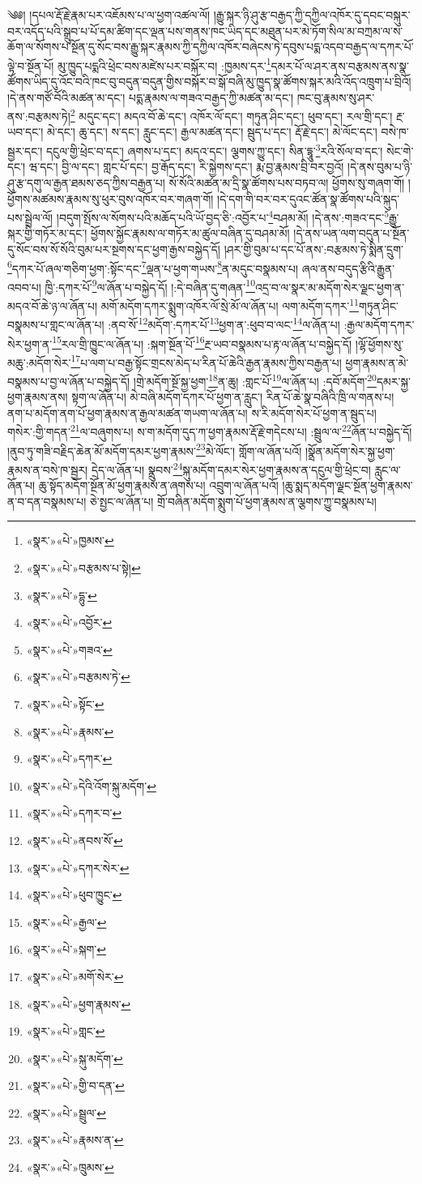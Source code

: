 ༄༅། །དཔལ་རྡོ་རྗེ་རྣམ་པར་འཇོམས་པ་ལ་ཕྱག་འཚལ་ལོ། །རྒྱུ་སྐར་ཉི་ཤུ་རྩ་བརྒྱད་ཀྱི་དཀྱིལ་འཁོར་དུ་དབང་བསྐུར་བར་འདོད་པའི་སྒྲུབ་པ་པོ་དམ་ཚིག་དང་ལྡན་པས་གནས་ཁང་ཡིད་དང་མཐུན་པར་མེ་ཏོག་སིལ་མ་བཀྲམ་ལ་ས་ཆོག་ལ་སོགས་པ་སྔོན་དུ་སོང་བས་རྒྱུ་སྐར་རྣམས་ཀྱི་དཀྱིལ་འཁོར་བཞེངས་ཏེ་དབུས་པདྨ་འདབ་བརྒྱད་ལ་དཀར་པོ་ལྟེ་བ་སྔོན་པོ། མུ་ཁྱུད་པདྨའི་ཕྲེང་བས་མཛེས་པར་བསྐོར་བ། :ཁྱམས་དར་\footnote{«སྣར་»«པེ་»ཁྱམས་}དམར་པོ་ལ་ཤར་ནས་བརྩམས་ནས་སྣ་ཚོགས་ཡིད་དུ་འོང་བའི་ཁང་བུ་བདུན་བདུན་གྱིས་བསྐོར་བ་སྒོ་བཞི་མུ་ཁྱུད་སྣ་ཚོགས་སྐར་མའི་འོད་འཁྲུག་པ་བྲིའོ། །དེ་ནས་གཙོ་བོའི་མཚན་མ་དང་། པདྨ་རྣམས་ལ་གཟའ་བརྒྱད་ཀྱི་མཚན་མ་དང་། ཁང་བུ་རྣམས་སུ་ཤར་ནས་:བརྩམས་ཏེ།\footnote{«སྣར་»«པེ་»བརྩམས་པ་སྟེ།} མདུང་དང་། མདའ་བོ་ཆེ་དང་། འཁོར་ལོ་དང་། གཏུན་ཤིང་དང་། ཕུབ་དང་། རལ་གྲི་དང་། རྔ་ཡབ་དང་། མེ་དང་། ཆུ་དང་། ས་དང་། རླུང་དང་། རྒྱལ་མཚན་དང་། སྦུད་པ་དང་། རྡོ་རྗེ་དང་། མེ་ལོང་དང་། བསེ་ཁ་སྦྱར་དང་། དངུལ་གྱི་ཕྲེང་བ་དང་། ཞགས་པ་དང་། མདའ་དང་། ལྕགས་ཀྱུ་དང་། སིན་དྷཱུ་\footnote{«སྣར་»«པེ་»དྷུ་}རའི་སོལ་བ་དང་། སེང་གེ་དང་། ཝ་དང་། བྱི་ལ་དང་། གླང་པོ་དང་། བྱ་རྒོད་དང་། རི་སྐྱེགས་དང་། རྨ་བྱ་རྣམས་བྲི་བར་བྱའོ། །དེ་ནས་བུམ་པ་ཉི་ཤུ་རྩ་དགུ་ལ་རྒྱན་ཐམས་ཅད་ཀྱིས་བརྒྱན་པ། སོ་སོའི་མཚན་མ་དྲི་སྣ་ཚོགས་པས་བཏབ་ལ། ཕྱོགས་སུ་གཞག་གོ། །ཕྱོགས་མཚམས་རྣམས་སུ་ཕུར་བུས་འཁོར་བར་གཞག་གོ། །དེ་དག་གི་བར་བར་དུའང་ཚོན་སྣ་ཚོགས་པའི་སྐུད་པས་སྦྲེལ་ལོ། །བདུག་སྤོས་ལ་སོགས་པའི་མཆོད་པའི་ཡོ་བྱད་ཅི་:འབྱོར་པ་\footnote{«སྣར་»«པེ་»འབྱོར་}བཤམ་མོ། །དེ་ནས་:གཟའ་དང་\footnote{«སྣར་»«པེ་»གཟའ་}རྒྱུ་སྐར་གྱི་གཏོར་མ་དང་། ཕྱོགས་སྐྱོང་རྣམས་ལ་གཏོར་མ་ཚུལ་བཞིན་དུ་བཤམ་མོ། །དེ་ནས་ཡན་ལག་བདུན་པ་སྔོན་དུ་སོང་བས་སོ་སོའི་བུམ་པར་སྔགས་དང་ཕྱག་རྒྱས་བསྐྱེད་དོ། །ཤར་གྱི་བུམ་པ་དང་པོ་ནས་:བརྩམས་ཏེ་སྨིན་དྲུག་\footnote{«སྣར་»«པེ་»བརྩམས་ཏེ་}དཀར་པོ་ཞལ་གཅིག་ཕྱག་:སྟོང་དང་\footnote{«སྣར་»«པེ་»སྟོང་}ལྡན་པ་ཕྱག་གཡས་\footnote{«སྣར་»«པེ་»རྣམས་}ན་མདུང་བསྣམས་པ། ཞལ་ནས་བདུད་རྩིའི་རྒྱུན་འབབ་པ། ཁྱི་:དཀར་པོ་\footnote{«སྣར་»«པེ་»དཀར་}ལ་ཞོན་པ་བསྐྱེད་དོ། །:དེ་བཞིན་དུ་གཞན་\footnote{«སྣར་»«པེ་»དེའི་འོག་སྐུ་མདོག་}འདྲ་བ་ལ་སྣར་མ་མདོག་སེར་ལྗང་ཕྱག་ན་མདའ་བོ་ཆེ་ཉ་ལ་ཞོན་པ། མགོ་མདོག་དཀར་སྨུག་འཁོར་ལོ་སྲེ་མོ་ལ་ཞོན་པ། ལག་མདོག་དཀར་\footnote{«སྣར་»«པེ་»དཀར་བ་}གཏུན་ཤིང་བསྣམས་པ་གླང་ལ་ཞོན་པ། :ནབ་སོ་\footnote{«སྣར་»«པེ་»ནབས་སོ་}མདོག་:དཀར་པོ་\footnote{«སྣར་»«པེ་»དཀར་སེར་}ཕྱག་ན་:ཕུབ་བ་ལང་\footnote{«སྣར་»«པེ་»ཕུབ་ཁྱུང་}ལ་ཞོན་པ། :རྒྱལ་མདོག་དཀར་སེར་ཕྱག་ན་\footnote{«སྣར་»«པེ་»རྒྱལ་}རལ་གྲི་ཁྱུང་ལ་ཞོན་པ། :སྐག་སྔོན་པོ་\footnote{«སྣར་»«པེ་»སྐག་}རྔ་ཡབ་བསྣམས་པ་རྟ་ལ་ཞོན་པ་བསྐྱེད་དོ། །ལྷོ་ཕྱོགས་སུ་མཆུ་:མདོག་སེར་\footnote{«སྣར་»«པེ་»མགོ་སེར་}པ་ལག་པ་བརྒྱ་སྟོང་གྲངས་མེད་པ་རིན་པོ་ཆེའི་རྒྱན་རྣམས་ཀྱིས་བརྒྱན་པ། ཕྱག་རྣམས་ན་མེ་བསྣམས་པ་བྱ་ལ་ཞོན་པ་བསྐྱེད་དོ། །གྲེ་མདོག་སྔོ་སྐྱ་ཕྱག་\footnote{«སྣར་»«པེ་»ཕྱག་རྣམས་}ན་ཆུ། :གླང་པོ་\footnote{«སྣར་»«པེ་»གླང་}ལ་ཞོན་པ། :དབོ་མདོག་\footnote{«སྣར་»«པེ་»སྐུ་མདོག་}དམར་སྐྱ་ཕྱག་རྣམས་ནས། སྟག་ལ་ཞོན་པ། མེ་བཞི་མདོག་དཀར་པོ་ཕྱག་ན་རླུང་། རིན་པོ་ཆེ་སྣ་བཞིའི་ཁྲི་ལ་གནས་པ། ནག་པ་མདོག་ནག་པོ་ཕྱག་རྣམས་ན་རྒྱལ་མཚན་གཡག་ལ་ཞོན་པ། ས་རི་མདོག་སེར་པོ་ཕྱག་ན་སྦུད་པ། གསེར་:གྱི་གདན་\footnote{«སྣར་»«པེ་»གྱི་བ་དན་}ལ་བཞུགས་པ། ས་ག་མདོག་དུད་ཀ་ཕྱག་རྣམས་རྡོ་རྗེ་གདེངས་པ། :སྦྲུལ་ལ་\footnote{«སྣར་»«པེ་»སྦྲུལ་}ཞོན་པ་བསྐྱེད་དོ། །ནུབ་ཏུ་གཟི་བརྗིད་ཆེན་མོ་མདོག་དམར་ཕྱག་རྣམས་\footnote{«སྣར་»«པེ་»རྣམས་ན་}མེ་ལོང་། གློག་ལ་ཞོན་པའོ། །སྣྲོན་མདོག་སེར་སྐྱ་ཕྱག་རྣམས་ན་བསེ་ཁ་སྦྱར། དྲེད་ལ་ཞོན་པ། སྣྲུབས་\footnote{«སྣར་»«པེ་»ཁྲུམས་}སྐུ་མདོག་དམར་སེར་ཕྱག་རྣམས་ན་དངུལ་གྱི་ཕྲེང་བ། རླུང་ལ་ཞོན་པ། ཆུ་སྟོད་མདོག་སྔོན་མོ་ཕྱག་རྣམས་ན་ཞགས་པ། འབྲུག་ལ་ཞོན་པའོ། །ཆུ་སྨད་མདོག་ལྗང་སྔོན་ཕྱག་རྣམས་ན་བ་དན་བསྣམས་པ། ཅེ་སྤྱང་ལ་ཞོན་པ། གྲོ་བཞིན་མདོག་སྨུག་པོ་ཕྱག་རྣམས་ན་ལྕགས་ཀྱུ་བསྣམས་པ། 